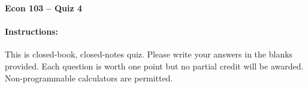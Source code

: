 \documentclass[addpoints,10pt]{exam}
\begin{document}
\thispagestyle{empty}

\noindent \textbf{Econ 103 -- Quiz 4}

\vspace{15pt}
\noindent
{}\hfill 

\paragraph{Instructions: } This is closed-book, closed-notes quiz. Please write your answers in the blanks provided. Each question is worth one point but no partial credit will be awarded. Non-programmable calculators are permitted.

\vspace{5pt}

\setlength\answerlinelength{6in}
\end{document}
